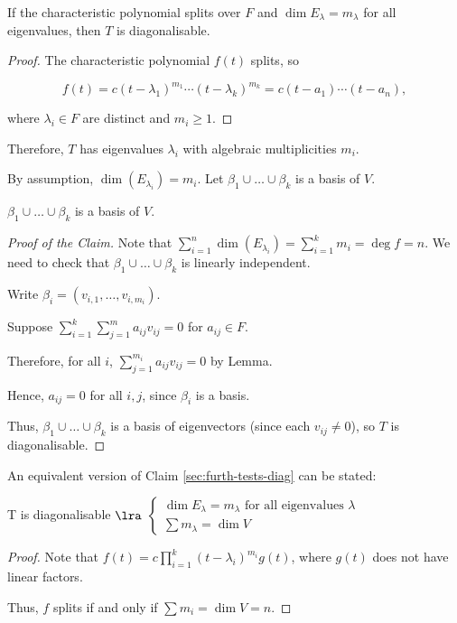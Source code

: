 \documentclass[11pt]{scrartcl}
\begin{document}
\begin{theorem}
  If the characteristic polynomial splits over $F$ and
  $\dim E_{\lambda} = m_{\lambda}$ for all eigenvalues, then $T$ is
  diagonalisable.
\end{theorem}

\begin{proof}
  The characteristic polynomial $f(t)$ splits, so

  \[f(t) = c(t-\lambda_1)^{m_1}\cdots(t-\lambda_k)^{m_k} = c(t-a_1)\cdots(t-a_{n}),\]

  where $\lambda_i\in F$ are distinct and $m_i\geq 1$.
\end{proof}

Therefore, $T$ has eigenvalues $\lambda_{i}$ with algebraic multiplicities $m_{i}$.

By assumption, $\dim(E_{\lambda_i}) = m_i$. Let
$\beta_1\cup\dots\cup\beta_k$ is a basis of $V$.

\begin{claim*}
  $\beta_1\cup\dots\cup\beta_k$ is a basis of $V$.
\end{claim*}

\begin{proof}[Proof of the Claim]
  Note that
  $\sum_{i=1}^n\dim(E_{\lambda_i})=\sum_{i=1}^km_i=\deg f = n$. We
  need to check that $\beta_1\cup\dots\cup\beta_k$ is linearly
  independent.

  Write $\beta_{i} = (v_{i, 1}, \dots, v_{i, m_{i}})$.

  Suppose $\sum_{i=1}^k\sum_{j=1}^ma_{ij}v_{ij} = 0$ for $a_{ij} \in F$.

  Therefore, for all $i$, $\sum_{j=1}^{m_i}a_{ij}v_{ij}=0$ by Lemma.

  Hence, $a_{ij}= 0$ for all $i,j$, since $\beta_{i}$ is a basis.

  Thus, $\beta_1\cup\dots\cup\beta_k$ is a basis of eigenvectors (since
  each $v_{ij}\neq 0$), so $T$ is diagonalisable.
\end{proof}

An equivalent version of Claim \ref{sec:furth-tests-diag} can be stated:

\begin{claim*}
T is diagonalisable $\lra$ $\begin{cases}
\dim E_{\lambda} = m_{\lambda} \text{ for all eigenvalues $\lambda$}\\
\sum m_{\lambda} = \dim V
\end{cases}
$
\end{claim*}
\begin{proof}
  Note that $f(t) = c\prod_{i=1}^k(t-\lambda_{i})^{m_i}g(t)$, where $g(t)$ does not have linear factors.

  Thus, $f$ splits if and only if $\sum m_{i} = \dim V = n$.
\end{proof}
\end{document}
